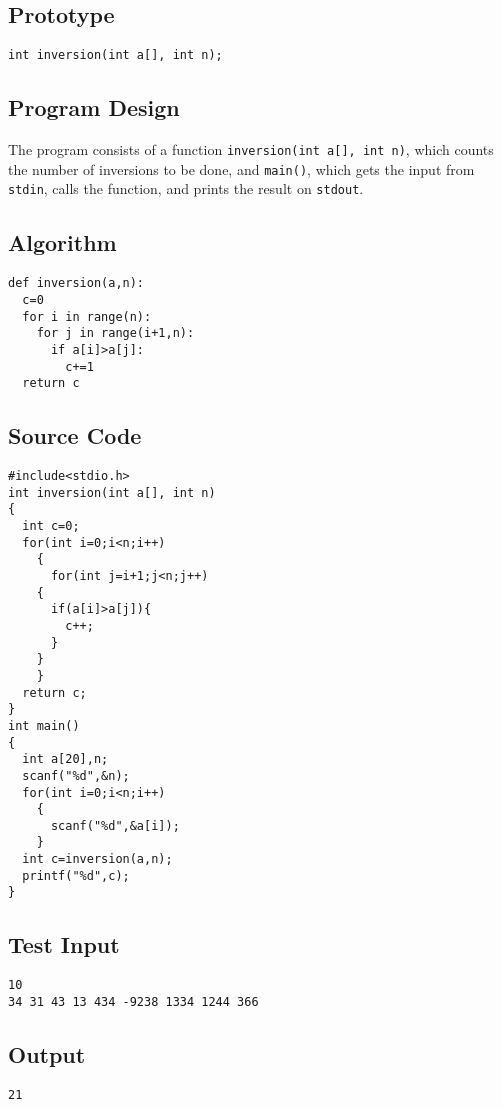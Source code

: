 \documentclass[11pt]{article}
\begin{document}
\subsection*{Prototype}
\label{sec-8-2}
\begin{verbatim}
int inversion(int a[], int n);
\end{verbatim}
\subsection*{Program Design}
\label{sec-8-3}
The program consists of a function \texttt{inversion(int a[], int n)}, which
counts the number of inversions to be done, and \texttt{main()}, which gets 
the input from \texttt{stdin}, calls the function, and prints the result
on \texttt{stdout}.
\subsection*{Algorithm}
\label{sec-8-4}
\begin{verbatim}
def inversion(a,n):
  c=0
  for i in range(n):
    for j in range(i+1,n):
      if a[i]>a[j]:
        c+=1
  return c
\end{verbatim}
\subsection*{Source Code}
\label{sec-8-5}
\begin{verbatim}
#include<stdio.h>
int inversion(int a[], int n)
{
  int c=0;
  for(int i=0;i<n;i++)
    {
      for(int j=i+1;j<n;j++)
	{
	  if(a[i]>a[j]){
	    c++;
	  }
	}
    }
  return c;
}
int main()
{
  int a[20],n;
  scanf("%d",&n);
  for(int i=0;i<n;i++)
    {
      scanf("%d",&a[i]);
    }
  int c=inversion(a,n);
  printf("%d",c);
}
\end{verbatim}
\subsection*{Test Input}
\label{sec-8-6}
\begin{verbatim}
10
34 31 43 13 434 -9238 1334 1244 366
\end{verbatim}
\subsection*{Output}
\label{sec-8-7}
\begin{verbatim}
21
\end{verbatim}
\end{document}
